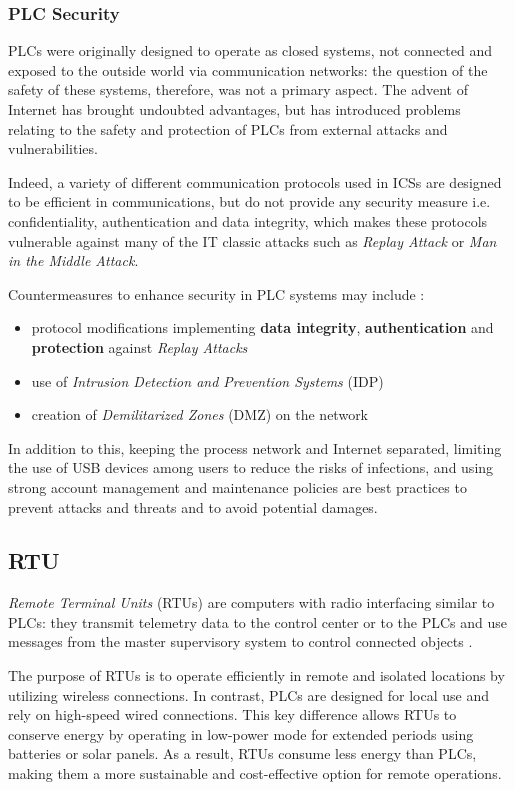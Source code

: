 \subsubsection{PLC Security}
\label{subsubsec:plc_security}
PLCs were originally designed to operate as closed systems, not connected and exposed to the outside world via communication networks: the question of the safety of these systems, therefore, was not a primary aspect. The advent of  Internet has brought undoubted advantages, but has introduced problems relating to the safety and protection of PLCs from external attacks and vulnerabilities.

Indeed, a variety of different communication protocols used in ICSs are designed to be efficient in communications, but do not provide any security measure i.e. confidentiality, authentication and data integrity, which makes these protocols vulnerable against many of the IT classic attacks such as \textit{Replay Attack} or \textit{Man in the Middle Attack}. 

\bigskip
Countermeasures to enhance security in PLC systems may include \cite{plc_security}:
\begin{itemize}
	\item protocol modifications implementing \textbf{data integrity}, \textbf{authentication} and \textbf{protection} against \textit{Replay Attacks}
	\item use of \textit{Intrusion Detection and Prevention Systems} (IDP) 
	\item creation of \textit{Demilitarized Zones} (DMZ) on the network
\end{itemize}

In addition to this, keeping the process network and Internet separated, limiting the use of USB devices among users to reduce the risks of infections, and using strong account management and maintenance policies are best practices to prevent attacks and threats and to avoid potential damages. 

\subsection{RTU}
\label{subsec:rtu}
\textit{Remote Terminal Units} (RTUs) are computers with radio interfacing similar to PLCs: they transmit telemetry data to the control center or to the PLCs and use messages from the master supervisory system to control connected objects \cite{rtu_definition}.

\bigskip
The purpose of RTUs is to operate efficiently in remote and isolated locations by utilizing wireless connections. In contrast, PLCs are designed for local use and rely on high-speed wired connections. This key difference allows RTUs to conserve energy by operating in low-power mode for extended periods using batteries or solar panels. As a result, RTUs consume less energy than PLCs, making them a more sustainable and cost-effective option for remote operations.

